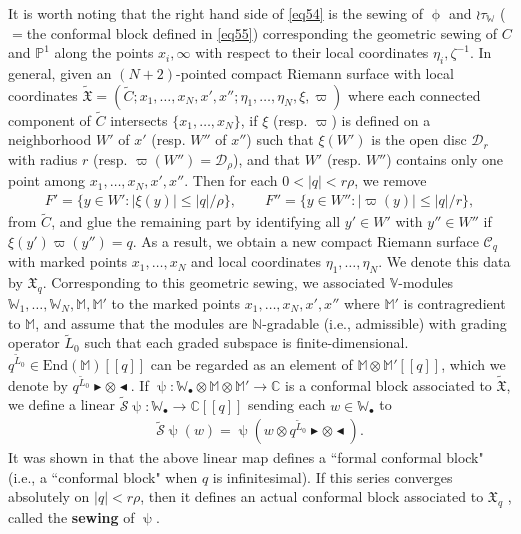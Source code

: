 \documentclass[12pt,a4paper,notitlepage]{article}
\theoremstyle{definition}
\theoremstyle{plain}
\newcommand{\fk}{\mathfrak}
\newcommand{\mc}{\mathcal}
\newcommand{\wtd}{\widetilde}
\newcommand{\End}{\mathrm{End}} %
\newcommand{\blt}{\bullet}
\newcommand{\Vbb}{\mathbb V}
\newcommand{\Wbb}{\mathbb W}
\newcommand{\Mbb}{\mathbb M}
\newcommand{\Cbb}{\mathbb C}
\newcommand{\Nbb}{\mathbb N}
\newcommand{\Pbb}{\mathbb P}
\newcommand{\btl}{\blacktriangleleft}
\newcommand{\btr}{\blacktriangleright}
\numberwithin{equation}{section}
\begin{document}
It is worth noting that the right hand side of \eqref{eq54} is the sewing of $\upphi$ and $\wr\tau_\Wbb$ ($=$the conformal block defined in \eqref{eq55}) corresponding the geometric sewing of $C$ and $\Pbb^1$ along the points $x_i,\infty$ with respect to their local coordinates $\eta_i,\zeta^{-1}$. In general, given an $(N+2)$-pointed compact Riemann surface with local coordinates $\wtd{\fk X}=(\wtd C;x_1,\dots,x_N,x',x'';\eta_1,\dots,\eta_N,\xi,\varpi)$ where each connected component of $\wtd C$ intersects $\{x_1,\dots,x_N\}$, if $\xi$ (resp. $\varpi$) is defined on a neighborhood $W'$ of $x'$ (resp. $W''$ of $x''$) such that $\xi(W')$ is the open disc $\mc D_r$ with radius $r$ (resp. $\varpi(W'')=\mc D_\rho$), and that $W'$ (resp. $W''$) contains only one point among $x_1,\dots,x_N,x',x''$. Then for each $0<|q|<r\rho$, we remove
\begin{align*}
F'=\{y\in W':|\xi(y)|\leq |q|/\rho\},\qquad F''=\{y\in W'':|\varpi(y)|\leq |q|/r\},	
\end{align*}
from $\wtd C$, and glue the remaining part by identifying all $y'\in W'$ with $y''\in W''$ if $\xi(y')\varpi(y'')=q$. As a result, we obtain a new compact Riemann surface $\mc C_q$ with marked points $x_1,\dots,x_N$ and local coordinates $\eta_1,\dots,\eta_N$. We denote this data by $\fk X_q$. Corresponding to this geometric sewing, we associated $\Vbb$-modules $\Wbb_1,\dots,\Wbb_N,\Mbb,\Mbb'$ to the marked points $x_1,\dots,x_N,x',x''$ where $\Mbb'$ is contragredient to $\Mbb$, and assume that the modules are $\Nbb$-gradable (i.e., admissible) with grading operator $\wtd L_0$ such that each graded subspace is finite-dimensional. $q^{\wtd L_0}\in\End(\Mbb)[[q]]$ can be regarded as an element of  $\Mbb\otimes\Mbb'[[q]]$, which we denote by $q^{\wtd L_0}\btr\otimes\btl$. If $\uppsi:\Wbb_\blt\otimes\Mbb\otimes\Mbb'\rightarrow\Cbb$ is a conformal block associated to $\wtd{\fk X}$, we define a linear $\wtd{\mc S}\uppsi:\Wbb_\blt\rightarrow\Cbb[[q]]$ sending each $w\in\Wbb_\blt$ to
\begin{gather}
	\wtd{\mc S}\uppsi(w)=\uppsi(w\otimes q^{\wtd L_0}\btr\otimes\btl).\label{eq56}
\end{gather}
It was shown in \cite[Thm. 8.5.1]{DGT19b} that the above linear map defines a ``formal conformal block" (i.e., a ``conformal block" when $q$ is infinitesimal). If this series converges absolutely on $|q|<r\rho$, then it defines an actual conformal block associated to $\fk X_q$ \cite[Thm. 11.2]{Gui20}, called the \textbf{sewing} of $\uppsi$.
\end{document}
